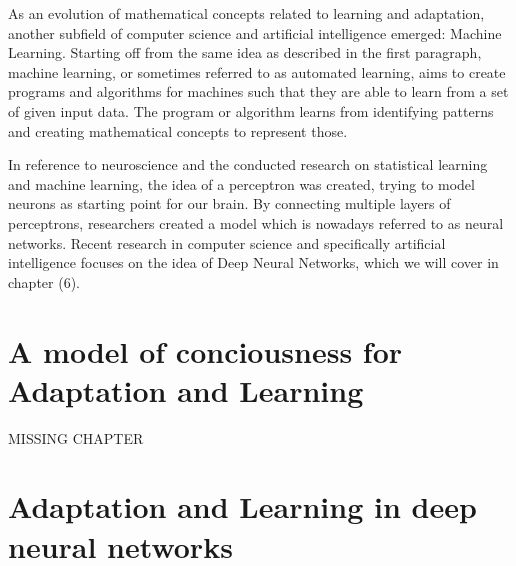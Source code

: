 \documentclass[conference]{IEEEtran}
\begin{document}
		As an evolution of mathematical concepts related to learning and adaptation, another subfield of computer science and artificial intelligence emerged: Machine Learning. Starting off from the same idea as described in the first paragraph, machine learning, or sometimes referred to as automated learning, aims to create programs and algorithms for machines such that they are able to learn from a set of given input data. The program or algorithm learns from identifying patterns and creating mathematical concepts to represent those. \cite{d8}

		In reference to neuroscience and the conducted research on statistical learning and machine learning, the idea of a perceptron was created, trying to model neurons as starting point for our brain. By connecting multiple layers of perceptrons, researchers created a model which is nowadays referred to as neural networks. Recent research in computer science and specifically artificial intelligence focuses on the idea of Deep Neural Networks, which we will cover in chapter (6).



\section{A model of conciousness for Adaptation and Learning}

	MISSING CHAPTER

\section{Adaptation and Learning in deep neural networks}
\end{document}
